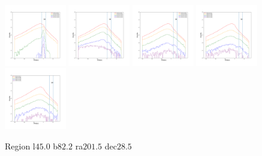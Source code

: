 \documentclass[12pt,prd]{article}
\begin{document}
\begin{figure}[h!]
\includegraphics[width=0.24\textwidth]{../figures/scanning_plotsgaiascan_l45_0_b82_2_ra201_5_dec28_5_npy_12.pdf}
\includegraphics[width=0.24\textwidth]{../figures/scanning_plotsgaiascan_l45_0_b82_2_ra201_5_dec28_5_npy_13.pdf}
\includegraphics[width=0.24\textwidth]{../figures/scanning_plotsgaiascan_l45_0_b82_2_ra201_5_dec28_5_npy_14.pdf}
\includegraphics[width=0.24\textwidth]{../figures/scanning_plotsgaiascan_l45_0_b82_2_ra201_5_dec28_5_npy_15.pdf}
\includegraphics[width=0.24\textwidth]{../figures/scanning_plotsgaiascan_l45_0_b82_2_ra201_5_dec28_5_npy_16.pdf}
\caption{Region l$45.0$ b$82.2$ ra$201.5$ dec$28.5$}
\end{figure}
\end{document}
